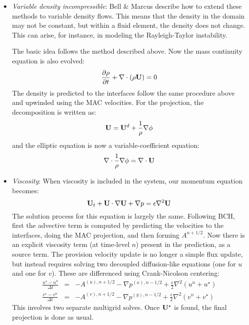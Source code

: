 \begin{itemize}

\item {\em Variable density incompressible}: Bell \& Marcus
  \cite{BellMarcus} describe how to extend these methods to variable
  density flows.  This means that the density in the domain may not be
  constant, but within a fluid element, the density does not change.
  This can arise, for instance, in modeling the Rayleigh-Taylor
  instability.

  The basic idea follows the method described above.  Now the 
  mass continuity equation is also evolved:
  \begin{equation}
  \frac{\partial \rho}{\partial t} + \nabla \cdot (\rho {\bf U}) = 0
  \end{equation}
  The density is predicted to the interfaces follow the same procedure
  above and upwinded using the MAC velocities.
  For the projection, the decomposition is written as:
  \begin{equation}
  {\bf U} = {\bf U}^d + \frac{1}{\rho}\nabla \phi
  \end{equation}
  and the elliptic equation is now a variable-coefficient equation:
  \begin{equation}
  \nabla \cdot \frac{1}{\rho} \nabla \phi = \nabla \cdot {\bf U}
  \end{equation}

\item {\em Viscosity}: When viscosity is included in the system, our
  momentum equation becomes:
  \begin{equation}
  {\bf U}_t + {\bf U}\cdot \nabla {\bf U} + \nabla p = \epsilon \nabla^2 {\bf U}
  \end{equation}
  The solution process for this equation is largely the same.
  Following BCH, first the advective term is computed by predicting
  the velocities to the interfaces, doing the MAC projection, and then
  forming $A^{n+1/2}$.  Now there is an explicit viscosity term (at
  time-level $n$) present in the prediction, as a source term.  The
  provision velocity update is no longer a simple flux update, but
  instead requires solving two decoupled diffusion-like equations (one
  for $u$ and one for $v$).  These are differenced using
  Crank-Nicolson centering:
  \begin{eqnarray}
  \frac{u^\star - u^n}{\Delta t} &=& - A^{(u),n+1/2} - \nabla p^{(x),n-1/2} 
       + \frac{\epsilon }{2} \nabla^2 (u^n + u^\star) \\
  \frac{v^\star - v^n}{\Delta t} &=& - A^{(v),n+1/2} - \nabla p^{(y),n-1/2} 
       + \frac{\epsilon }{2} \nabla^2 (v^n + v^\star) 
  \end{eqnarray}
  This involves two separate multigrid solves.  Once ${\bf U}^\star$ is found,
  the final projection is done as usual.


\end{itemize}
